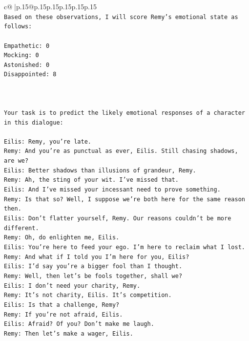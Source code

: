 \documentclass{article}
\begin{document}
{\begin{supertabular}{c@{$\;$}|p{.15\linewidth}@{}p{.15\linewidth}p{.15\linewidth}p{.15\linewidth}p{.15\linewidth}p{.15\linewidth}}
{{{\\ 
\texttt{Based on these observations, I will score Remy's emotional state as follows:} \\
\\ 
\texttt{Empathetic: 0} \\
\texttt{Mocking: 0} \\
\texttt{Astonished: 0} \\
\texttt{Disappointed: 8} \\
\\ 
\\ 
\\ 
\texttt{Your task is to predict the likely emotional responses of a character in this dialogue:} \\
\\ 
\texttt{Eilis: Remy, you're late.} \\
\texttt{Remy: And you're as punctual as ever, Eilis. Still chasing shadows, are we?} \\
\texttt{Eilis: Better shadows than illusions of grandeur, Remy.} \\
\texttt{Remy: Ah, the sting of your wit. I've missed that. } \\
\texttt{Eilis: And I've missed your incessant need to prove something.} \\
\texttt{Remy: Is that so? Well, I suppose we're both here for the same reason then.} \\
\texttt{Eilis: Don't flatter yourself, Remy. Our reasons couldn't be more different.} \\
\texttt{Remy: Oh, do enlighten me, Eilis. } \\
\texttt{Eilis: You're here to feed your ego. I'm here to reclaim what I lost.} \\
\texttt{Remy: And what if I told you I'm here for you, Eilis?} \\
\texttt{Eilis: I'd say you're a bigger fool than I thought.} \\
\texttt{Remy: Well, then let's be fools together, shall we? } \\
\texttt{Eilis: I don't need your charity, Remy.} \\
\texttt{Remy: It's not charity, Eilis. It's competition. } \\
\texttt{Eilis: Is that a challenge, Remy?} \\
\texttt{Remy: If you're not afraid, Eilis.} \\
\texttt{Eilis: Afraid? Of you? Don't make me laugh.} \\
\texttt{Remy: Then let's make a wager, Eilis. } \\
}}}
\end{supertabular}}
\end{document}
